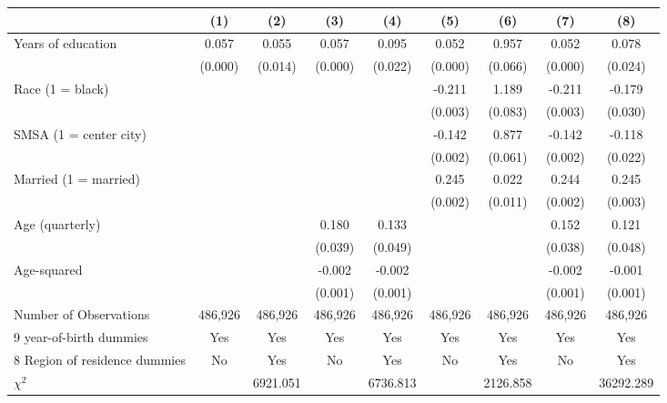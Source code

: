 {
\def\sym#1{\ifmmode^{#1}\else\(^{#1}\)\fi}
\begin{tabular}{l*{8}{c}}
\hline\hline
                    &\multicolumn{1}{c}{(1)}&\multicolumn{1}{c}{(2)}&\multicolumn{1}{c}{(3)}&\multicolumn{1}{c}{(4)}&\multicolumn{1}{c}{(5)}&\multicolumn{1}{c}{(6)}&\multicolumn{1}{c}{(7)}&\multicolumn{1}{c}{(8)}\\
\hline
Years of education  &       0.057&       0.055&       0.057&       0.095&       0.052&       0.957&       0.052&       0.078\\
                    &     (0.000)&     (0.014)&     (0.000)&     (0.022)&     (0.000)&     (0.066)&     (0.000)&     (0.024)\\
Race (1 = black)    &            &            &            &            &      -0.211&       1.189&      -0.211&      -0.179\\
                    &            &            &            &            &     (0.003)&     (0.083)&     (0.003)&     (0.030)\\
SMSA (1 = center city)&            &            &            &            &      -0.142&       0.877&      -0.142&      -0.118\\
                    &            &            &            &            &     (0.002)&     (0.061)&     (0.002)&     (0.022)\\
Married (1 = married)&            &            &            &            &       0.245&       0.022&       0.244&       0.245\\
                    &            &            &            &            &     (0.002)&     (0.011)&     (0.002)&     (0.003)\\
Age (quarterly)     &            &            &       0.180&       0.133&            &            &       0.152&       0.121\\
                    &            &            &     (0.039)&     (0.049)&            &            &     (0.038)&     (0.048)\\
Age-squared         &            &            &      -0.002&      -0.002&            &            &      -0.002&      -0.001\\
                    &            &            &     (0.001)&     (0.001)&            &            &     (0.001)&     (0.001)\\
\hline
Number of Observations&     486,926&     486,926&     486,926&     486,926&     486,926&     486,926&     486,926&     486,926\\
9 year-of-birth dummies&         Yes&         Yes&         Yes&         Yes&         Yes&         Yes&         Yes&         Yes\\
8 Region of residence dummies&          No&         Yes&          No&         Yes&          No&         Yes&          No&         Yes\\
$\chi^2$            &            &    6921.051&            &    6736.813&            &    2126.858&            &   36292.289\\
\hline\hline
\end{tabular}
}
